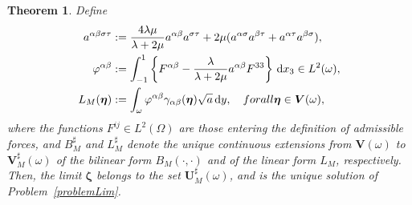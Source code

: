 \documentclass{amsart}
\newtheorem{theorem}{Theorem}[section]
\def\dd{\, \mathrm{d}}
\begin{document}
\begin{theorem}
Define
\begin{equation*}
	\begin{aligned}
		a^{\alpha\beta\sigma\tau}&:=\dfrac{4\lambda\mu}{\lambda+2\mu}a^{\alpha\beta}a^{\sigma\tau}+2\mu(a^{\alpha\sigma}a^{\beta\tau}+a^{\alpha\tau}a^{\beta\sigma}),\\
		\varphi^{\alpha\beta}&:=\int_{-1}^{1} \left\{F^{\alpha\beta}-\dfrac{\lambda}{\lambda+2\mu}a^{\alpha\beta}F^{33}\right\} \dd x_3 \in L^2(\omega),\\
		L_M(\bm{\eta})&:=\int_{\omega} \varphi^{\alpha\beta} \gamma_{\alpha\beta}(\bm{\eta})\sqrt{a} \dd y,\quad\textup{ for all }\bm{\eta} \in\bm{V}(\omega),
	\end{aligned}
\end{equation*}
where the functions $F^{ij} \in L^2(\Omega)$ are those entering the definition of admissible forces, and $B_M^\sharp$ and $L_M^\sharp$ denote the unique continuous extensions from $\bm{V}(\omega)$ to $\bm{V}_M^\sharp(\omega)$ of the bilinear form $B_M(\cdot,\cdot)$ and of the linear form $L_M$, respectively.
Then, the limit $\bm{\zeta}$ belongs to the set $\bm{U}_M^\sharp(\omega)$, and is the unique solution of Problem~\ref{problemLim}.
\end{theorem}
\end{document}
